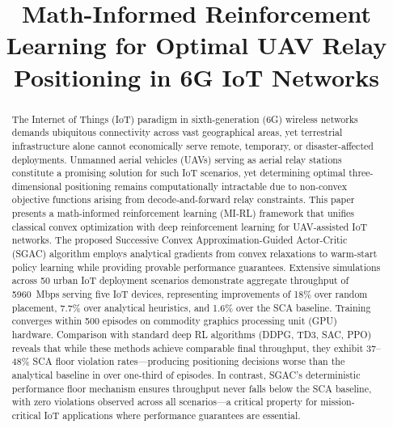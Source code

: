 \documentclass[journal]{IEEEtran}
\begin{document}
\title{Math-Informed Reinforcement Learning for Optimal UAV Relay Positioning in 6G IoT Networks}

\author{
}

\maketitle

\begin{abstract}
The Internet of Things (IoT) paradigm in sixth-generation (6G) wireless networks demands ubiquitous connectivity across vast geographical areas, yet terrestrial infrastructure alone cannot economically serve remote, temporary, or disaster-affected deployments. Unmanned aerial vehicles (UAVs) serving as aerial relay stations constitute a promising solution for such IoT scenarios, yet determining optimal three-dimensional positioning remains computationally intractable due to non-convex objective functions arising from decode-and-forward relay constraints. This paper presents a math-informed reinforcement learning (MI-RL) framework that unifies classical convex optimization with deep reinforcement learning for UAV-assisted IoT networks. The proposed Successive Convex Approximation-Guided Actor-Critic (SGAC) algorithm employs analytical gradients from convex relaxations to warm-start policy learning while providing provable performance guarantees. Extensive simulations across 50 urban IoT deployment scenarios demonstrate aggregate throughput of 5960~Mbps serving five IoT devices, representing improvements of 18\% over random placement, 7.7\% over analytical heuristics, and 1.6\% over the SCA baseline. Training converges within 500 episodes on commodity graphics processing unit (GPU) hardware. Comparison with standard deep RL algorithms (DDPG, TD3, SAC, PPO) reveals that while these methods achieve comparable final throughput, they exhibit 37--48\% SCA floor violation rates---producing positioning decisions worse than the analytical baseline in over one-third of episodes. In contrast, SGAC's deterministic performance floor mechanism ensures throughput never falls below the SCA baseline, with zero violations observed across all scenarios---a critical property for mission-critical IoT applications where performance guarantees are essential.
\end{abstract}
\end{document}
